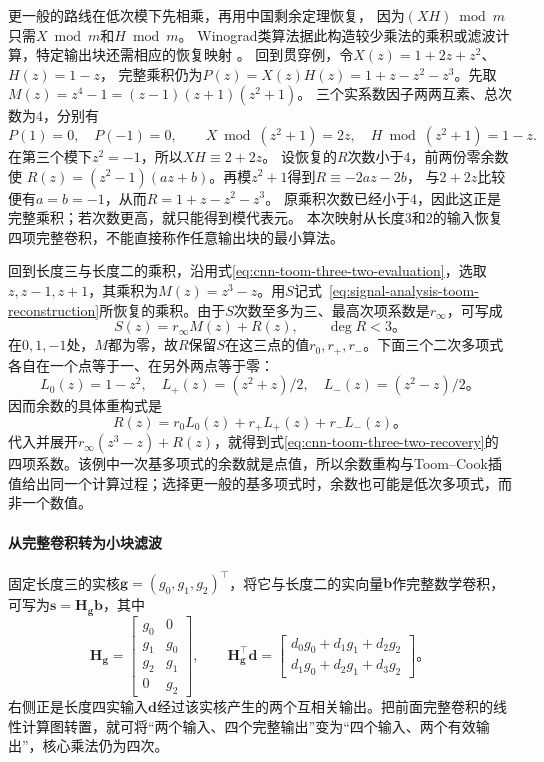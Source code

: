 更一般的路线在低次模下先相乘，再用中国剩余定理恢复，
因为$(XH)\bmod m$只需$X\bmod m$和$H\bmod m$。
Winograd类算法据此构造较少乘法的乘积或滤波计算，特定输出块还需相应的恢复映射
。
回到贯穿例，令$X(z)=1+2z+z^2$、$H(z)=1-z$，
完整乘积仍为$P(z)=X(z)H(z)=1+z-z^2-z^3$。先取
$M(z)=z^4-1=(z-1)(z+1)(z^2+1)$。
三个实系数因子两两互素、总次数为$4$，分别有
\[
  P(1)=0,\quad P(-1)=0,\qquad
  X\bmod(z^2+1)=2z,\quad H\bmod(z^2+1)=1-z.
\]
在第三个模下$z^2=-1$，所以$XH\equiv2+2z$。
设恢复的$R$次数小于$4$，前两份零余数使
$R(z)=(z^2-1)(az+b)$。再模$z^2+1$得到$R\equiv-2az-2b$，
与$2+2z$比较便有$a=b=-1$，从而$R=1+z-z^2-z^3$。
原乘积次数已经小于$4$，因此这正是完整乘积；若次数更高，就只能得到模代表元。
本次映射从长度$3$和$2$的输入恢复四项完整卷积，不能直接称作任意输出块的最小算法。

回到长度三与长度二的乘积，沿用式\eqref{eq:cnn-toom-three-two-evaluation}，选取$z,z-1,z+1$，其乘积为$M(z)=z^3-z$。用$S$记式~\eqref{eq:signal-analysis-toom-reconstruction}所恢复的乘积。由于$S$次数至多为三、最高次项系数是$r_\infty$，可写成
\begin{equation}
  S(z)=r_\infty M(z)+R(z),\qquad \deg R<3\text{。}
  \label{eq:cnn-winograd-polynomial-remainder}
\end{equation}
在$0,1,-1$处，$M$都为零，故$R$保留$S$在这三点的值$r_0,r_+,r_-$。下面三个二次多项式各自在一个点等于一、在另外两点等于零：
\[
  L_0(z)=1-z^2,\quad
  L_+(z)=(z^2+z)/2,\quad
  L_-(z)=(z^2-z)/2\text{。}
\]
因而余数的具体重构式是
\begin{equation}
  R(z)=r_0L_0(z)+r_+L_+(z)+r_-L_-(z)\text{。}
  \label{eq:cnn-winograd-remainder-reconstruction}
\end{equation}
代入并展开$r_\infty(z^3-z)+R(z)$，就得到式\eqref{eq:cnn-toom-three-two-recovery}的四项系数。该例中一次基多项式的余数就是点值，所以余数重构与Toom--Cook插值给出同一个计算过程；选择更一般的基多项式时，余数也可能是低次多项式，而非一个数值。

\paragraph{从完整卷积转为小块滤波}

固定长度三的实核$\bm g=(g_0,g_1,g_2)^\top$，将它与长度二的实向量$\bm b$作完整数学卷积，可写为$\bm s=\bm H_{\bm g}\bm b$，其中
\begin{equation}
  \bm H_{\bm g}=\begin{bmatrix}
    g_0&0\\g_1&g_0\\g_2&g_1\\0&g_2
  \end{bmatrix},\qquad
  \bm H_{\bm g}^\top\bm d=
  \begin{bmatrix}
    d_0g_0+d_1g_1+d_2g_2\\
    d_1g_0+d_2g_1+d_3g_2
  \end{bmatrix}\text{。}
  \label{eq:cnn-winograd-filter-transposition}
\end{equation}
右侧正是长度四实输入$\bm d$经过该实核产生的两个互相关输出。把前面完整卷积的线性计算图转置，就可将“两个输入、四个完整输出”变为“四个输入、两个有效输出”，核心乘法仍为四次。

